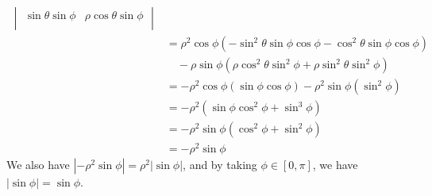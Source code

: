\begin{solution}
\begin{align*}
\begin{vmatrix}
            \sin \theta \sin \phi &  \rho \cos \theta \sin \phi \\
        \end{vmatrix}\\
        &= \rho ^2 \cos \phi \left( -\sin^2 \theta \sin \phi \cos \phi-\cos ^2\theta \sin \phi \cos \phi   \right)\\
        &\quad -\rho \sin \phi \left( \rho \cos ^2\theta \sin ^2\phi +\rho \sin ^2\theta \sin ^2\phi  \right)\\
        &=-\rho ^2 \cos \phi \left( \sin \phi \cos \phi  \right) -\rho^2 \sin \phi \left( \sin ^2\phi  \right) \\
        &=-\rho ^2 \left( \sin \phi \cos ^2\phi +\sin ^3\phi  \right) \\
        &=-\rho ^2 \sin \phi \left( \cos ^2\phi +\sin ^2\phi  \right) \\
        &=-\rho ^2 \sin \phi 
    \end{align*}
    We also have \(\left\vert -\rho ^2 \sin \phi  \right\vert = \rho ^2 \left\vert \sin \phi  \right\vert  \), and by taking \(\phi \in[0,\pi ]\), we have \(\left\vert \sin \phi  \right\vert=\sin \phi  \).
\end{solution}